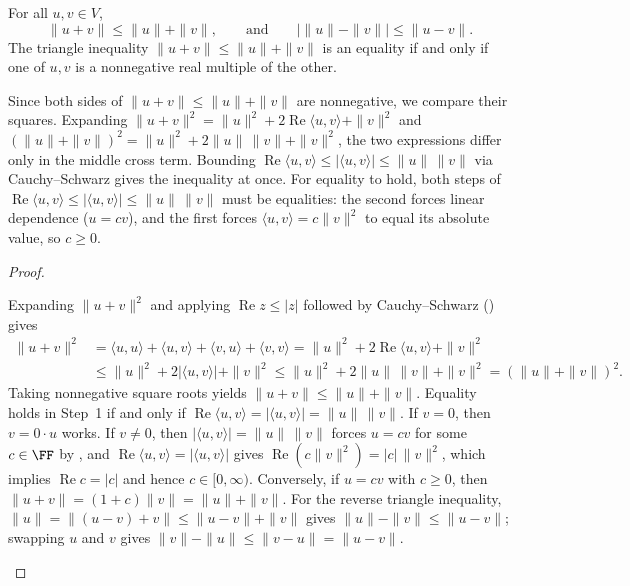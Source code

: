 \documentclass[10pt]{scrartcl}
\newcommand{\ip}[2]{\langle #1,#2\rangle}
\begin{document}
\begin{proposition*}
  For all $u,v\in V$,
  \[
    \|u+v\| \le \|u\| + \|v\|, \qquad\text{and}\qquad \big|\|u\|-\|v\|\big| \le \|u-v\|.
  \]
  The triangle inequality $\|u+v\|\le\|u\|+\|v\|$ is an equality if and only if one of $u,v$ is a nonnegative real multiple of the other.
\end{proposition*}
\begin{ideabox}
  Since both sides of $\|u+v\|\le\|u\|+\|v\|$ are nonnegative, we compare their squares. Expanding $\|u+v\|^2=\|u\|^2+2\operatorname{Re}\ip uv+\|v\|^2$ and $(\|u\|+\|v\|)^2=\|u\|^2+2\|u\|\,\|v\|+\|v\|^2$, the two expressions differ only in the middle cross term. Bounding $\operatorname{Re}\ip uv \le |\ip uv| \le \|u\|\,\|v\|$ via Cauchy--Schwarz gives the inequality at once. For equality to hold, both steps of $\operatorname{Re}\ip uv \le |\ip uv| \le \|u\|\,\|v\|$ must be equalities: the second forces linear dependence ($u=cv$), and the first forces $\ip uv=c\|v\|^2$ to equal its absolute value, so $c\ge 0$.
\end{ideabox}
\begin{proof}
  \begin{steps}
    \ii Expanding $\|u+v\|^2$ and applying $\operatorname{Re}z\le |z|$ followed by Cauchy--Schwarz () gives
    \begin{align*}
      \|u+v\|^2 &= \ip uu + \ip uv + \ip vu + \ip vv = \|u\|^2 + 2\operatorname{Re}\ip uv + \|v\|^2 \\
      &\le \|u\|^2 + 2|\ip uv| + \|v\|^2 \le \|u\|^2 + 2\|u\|\,\|v\| + \|v\|^2 = (\|u\|+\|v\|)^2.
    \end{align*}
    Taking nonnegative square roots yields $\|u+v\|\le \|u\|+\|v\|$.
    \ii Equality holds in Step~1 if and only if $\operatorname{Re}\ip uv = |\ip uv| = \|u\|\,\|v\|$. If $v=0$, then $v=0\cdot u$ works. If $v\ne 0$, then $|\ip uv|=\|u\|\,\|v\|$ forces $u=cv$ for some $c\in\FF$ by , and $\operatorname{Re}\ip uv=|\ip uv|$ gives $\operatorname{Re}(c\|v\|^2)=|c|\,\|v\|^2$, which implies $\operatorname{Re}c=|c|$ and hence $c\in[0,\infty)$. Conversely, if $u=cv$ with $c\ge 0$, then $\|u+v\|=(1+c)\|v\|=\|u\|+\|v\|$.
    \ii For the reverse triangle inequality, $\|u\|=\|(u-v)+v\|\le\|u-v\|+\|v\|$ gives $\|u\|-\|v\|\le\|u-v\|$; swapping $u$ and $v$ gives $\|v\|-\|u\|\le\|v-u\|=\|u-v\|$.
  \end{steps}
\end{proof}
\end{document}
